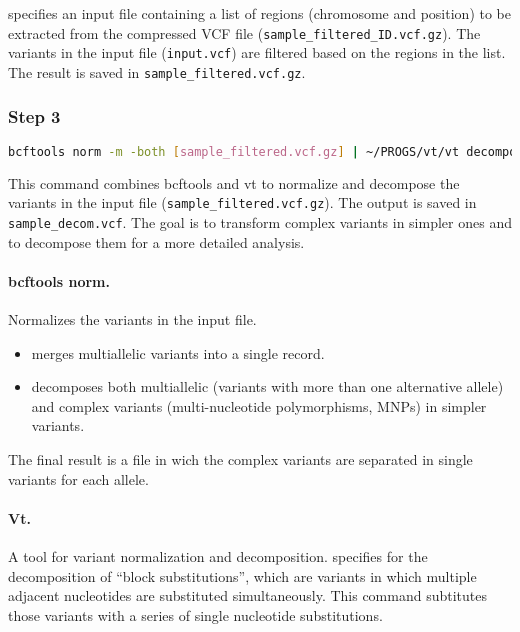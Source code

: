  specifies an input file containing a list of regions (chromosome and position) to be extracted from the compressed VCF file (\texttt{sample\_filtered\_ID.vcf.gz}). The variants in the input file (\texttt{input.vcf}) are filtered based on the regions in the list. The result is saved in \texttt{sample\_filtered.vcf.gz}.

\subsubsection*{Step 3}
\begin{lstlisting}[breaklines=true, language=bash]
    bcftools norm -m -both [sample_filtered.vcf.gz] | ~/PROGS/vt/vt decompose_blocksub - -o [sample_decom.vcf]
\end{lstlisting}

This command combines bcftools and vt to normalize and decompose the variants in the input file (\texttt{sample\_filtered.vcf.gz}). The output is saved in \texttt{sample\_decom.vcf}. The goal is to transform complex variants in simpler ones and to decompose them for a more detailed analysis.

\paragraph*{bcftools norm.} Normalizes the variants in the input file. 

\begin{itemize}
    \item {} merges multiallelic variants into a single record.
    \item {} decomposes both multiallelic (variants with more than one alternative allele) and complex variants (multi-nucleotide polymorphisms, MNPs) in simpler variants. 
\end{itemize}

The final result is a file in wich the complex variants are separated in single variants for each allele.

\paragraph*{Vt.} A tool for variant normalization and decomposition.  specifies for the decomposition of “block substitutions”, which are variants in which multiple adjacent nucleotides are substituted simultaneously. This command subtitutes those variants with a series of single nucleotide substitutions.

